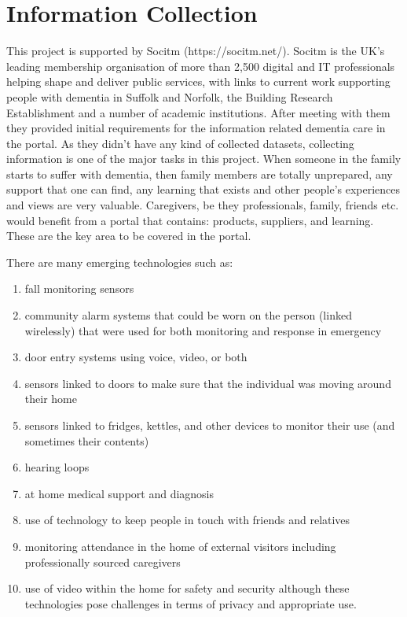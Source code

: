 \section{Information Collection}
This project is supported by Socitm (https://socitm.net/). Socitm is the UK’s leading
membership organisation of more than 2,500 digital and IT professionals helping shape and
deliver public services, with links to current work supporting people with dementia in Suffolk and Norfolk, the Building Research Establishment and a number of academic institutions. After meeting with them they provided initial requirements for the information related dementia care in the portal. As they didn’t have any kind of collected datasets, collecting information is one of the major tasks in this project. When someone in the family starts to suffer with dementia, then family members are totally unprepared, any support that one can find, any learning that exists and other people’s experiences and views are very valuable. Caregivers, be they professionals, family, friends etc. would benefit from a portal that contains: products, suppliers, and learning. These are the key area to be covered in the portal. 

There are many emerging technologies such as:
\begin{enumerate}[label=$\ast$]
	\item fall monitoring sensors
	\item community alarm systems that could be worn on the person (linked wirelessly) that were used for both monitoring and response in emergency
	\item door entry systems using voice, video, or both
	\item sensors linked to doors to make sure that the individual was moving around their home
	\item sensors linked to fridges, kettles, and other devices to monitor their use (and sometimes their contents)
	\item hearing loops
	\item at home medical support and diagnosis
	\item use of technology to keep people in touch with friends and relatives
	\item monitoring attendance in the home of external visitors including professionally sourced caregivers
	\item use of video within the home for safety and security although these technologies pose challenges in terms of privacy and appropriate use.
\end{enumerate}


